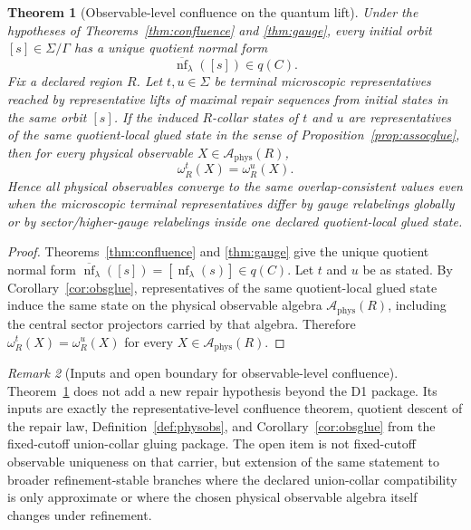 \documentclass[11pt]{article}
\newtheorem{theorem}{Theorem}[section]
\theoremstyle{remark}
\newtheorem{remark}[theorem]{Remark}
\theoremstyle{plain}
\begin{document}
\begin{theorem}[Observable-level confluence on the quantum lift]\label{thm:obsconfluence}
Under the hypotheses of Theorems~\ref{thm:confluence} and \ref{thm:gauge}, every initial orbit
\([s]\in\Sigma/\Gamma\) has a unique quotient normal form
\[
\overline{\operatorname{nf}}_\lambda([s])\in q(C).
\]
Fix a declared region \(R\). Let \(t,u\in\Sigma\) be terminal microscopic representatives reached
by representative lifts of maximal repair sequences from initial states in the same orbit
\([s]\). If the induced \(R\)-collar states of \(t\) and \(u\) are representatives of the same
quotient-local glued state in the sense of
Proposition~\ref{prop:assocglue}, then for every physical observable
\(X\in\mathcal A_{\mathrm{phys}}(R)\),
\[
\omega_R^t(X)=\omega_R^u(X).
\]
Hence all physical observables converge to the same overlap-consistent values even when the
microscopic terminal representatives differ by gauge relabelings globally or by sector/higher-gauge
relabelings inside one declared quotient-local glued state.
\end{theorem}

\begin{proof}
Theorems~\ref{thm:confluence} and \ref{thm:gauge} give the unique quotient normal form
\(\overline{\operatorname{nf}}_\lambda([s])=[\operatorname{nf}_\lambda(s)]\in q(C)\). Let
\(t\) and \(u\) be as stated. By Corollary~\ref{cor:obsglue}, representatives of the same
quotient-local glued state induce the same state on the physical observable algebra
\(\mathcal A_{\mathrm{phys}}(R)\), including the central sector projectors carried by that
algebra. Therefore \(\omega_R^t(X)=\omega_R^u(X)\) for every
\(X\in\mathcal A_{\mathrm{phys}}(R)\).
\end{proof}

\begin{remark}[Inputs and open boundary for observable-level confluence]\label{rem:obsconfluence}
Theorem~\ref{thm:obsconfluence} does not add a new repair hypothesis beyond the D1 package. Its
inputs are exactly the representative-level confluence theorem, quotient descent of the repair
law, Definition~\ref{def:physobs}, and Corollary~\ref{cor:obsglue} from the fixed-cutoff
union-collar gluing package. The open item is not fixed-cutoff observable uniqueness on that
carrier, but extension of the same statement to broader refinement-stable branches where the
declared union-collar compatibility is only approximate or where the chosen physical observable
algebra itself changes under refinement.
\end{remark}
\end{document}
